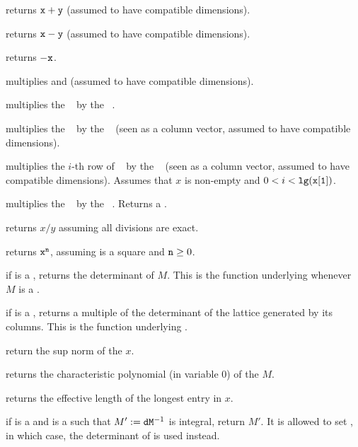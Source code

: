  returns ${\tt x} + {\tt y}$ (assumed to have
compatible dimensions).

 returns ${\tt x} - {\tt y}$ (assumed to have
compatible dimensions).

 returns $-{\tt x}$.

 multiplies  and  (assumed to
have compatible dimensions).

 multiplies the ~
by the ~.

 multiplies the ~
by the ~ (seen as a column vector, assumed to have compatible
dimensions).

 multiplies the $i$-th row
of ~ by the ~ (seen as a column vector, assumed
to have compatible dimensions). Assumes that $x$ is non-empty and
$0 < i < {\tt lg(x[1])}$.

 multiplies the ~
by the ~. Returns a .

 returns $x/y$ assuming all divisions
are exact.

 returns ${\tt x}^{\tt n}$, assuming 
is a square  and ${\tt n}\geq 0$.

 if  is a , returns the determinant of
$M$. This is the function underlying  whenever $M$ is a .

 if  is a , returns a multiple of
the determinant of the lattice generated by its columns. This is the function
underlying .

 return the sup norm of the  $x$.

 returns the characteristic polynomial (in
variable $0$) of the  $M$.

 returns the effective length of the longest
entry in $x$.

 if  is a  and 
is a  such that $M' := {\tt d}{\tt M}^{-1}$ is integral,
return $M'$. It is allowed to set , in which case, the
determinant of  is used instead.

